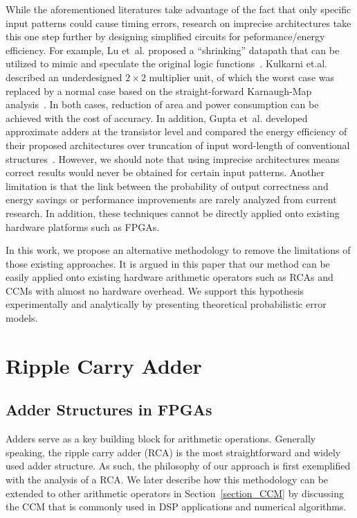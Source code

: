 \documentclass[prodmode,acmtrets]{acmsmall} %
\begin{document}
While the aforementioned literatures take advantage of the fact that only specific input patterns could cause timing errors, research on imprecise architectures take this one step further by designing simplified circuits for peformance/energy efficiency. For example, Lu et~al. proposed a ``shrinking'' datapath that can be utilized to mimic and speculate the original logic functions~\cite{IntelSpeeding}. Kulkarni et.al. described an underdesigned $2\times2$ multiplier unit, of which the worst case was replaced by a normal case based on the straight-forward Karnaugh-Map analysis~\cite{Undersigned2x2multiplier}. In both cases, reduction of area and power consumption can be achieved with the cost of accuracy. In addition, Gupta et~al. developed approximate adders at the transistor level and compared the energy efficiency of their proposed architectures over truncation of input word-length of conventional structures~\cite{Gupta2013TransCADICS}. However, we should note that using imprecise architectures means correct results would never be obtained for certain input patterns. Another limitation is that the link between the probability of output correctness and energy savings or performance improvements are rarely analyzed from current research. In addition, these techniques cannot be directly applied onto existing hardware platforms such as FPGAs.

In this work, we propose an alternative methodology to remove the limitations of those existing approaches. It is argued in this paper that our method can be easily applied onto existing hardware arithmetic operators such as RCAs and CCMs with almost no hardware overhead. We support this hypothesis experimentally and analytically by presenting theoretical probabilistic error models.

\section{Ripple Carry Adder}\label{section_RCA}
\subsection{Adder Structures in FPGAs}
Adders serve as a key building block for arithmetic operations. Generally speaking, the ripple carry adder (RCA) is the most straightforward and widely used adder structure. As such, the philosophy of our approach is first exemplified with the analysis of a RCA. We later describe how this methodology can be extended to other arithmetic operators in Section~\ref{section_CCM} by discussing  the CCM that is commonly used in DSP applications and numerical algorithms.
\end{document}
